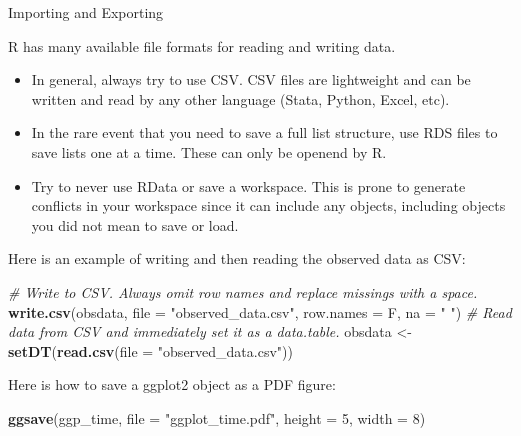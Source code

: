 \documentclass[10pt,ignorenonframetext,]{beamer}
\newenvironment{Shaded}{\begin{snugshade}}{\end{snugshade}}
\newcommand{\KeywordTok}[1]{\textcolor[rgb]{0.13,0.29,0.53}{\textbf{{#1}}}}
\newcommand{\DataTypeTok}[1]{\textcolor[rgb]{0.13,0.29,0.53}{{#1}}}
\newcommand{\DecValTok}[1]{\textcolor[rgb]{0.00,0.00,0.81}{{#1}}}
\newcommand{\StringTok}[1]{\textcolor[rgb]{0.31,0.60,0.02}{{#1}}}
\newcommand{\CommentTok}[1]{\textcolor[rgb]{0.56,0.35,0.01}{\textit{{#1}}}}
\newcommand{\NormalTok}[1]{{#1}}
\providecommand{\tightlist}{%
\setlength{\itemsep}{0pt}\setlength{\parskip}{0pt}}
\begin{document}
\begin{frame}[fragile]{Importing and Exporting}

R has many available file formats for reading and writing data.

\begin{itemize}
\tightlist
\item
  In general, always try to use CSV. CSV files are lightweight and can
  be written and read by any other language (Stata, Python, Excel, etc).
\item
  In the rare event that you need to save a full list structure, use RDS
  files to save lists one at a time. These can only be openend by R.
\item
  Try to never use RData or save a workspace. This is prone to generate
  conflicts in your workspace since it can include any objects,
  including objects you did not mean to save or load.
\end{itemize}

Here is an example of writing and then reading the observed data as CSV:

\footnotesize

\begin{Shaded}
\begin{Highlighting}[]
\CommentTok{# Write to CSV. Always omit row names and replace missings with a space.}
\KeywordTok{write.csv}\NormalTok{(obsdata, }\DataTypeTok{file =} \StringTok{"observed_data.csv"}\NormalTok{, }\DataTypeTok{row.names =} \NormalTok{F, }\DataTypeTok{na =} \StringTok{" "}\NormalTok{)}
\CommentTok{# Read data from CSV and immediately set it as a data.table.}
\NormalTok{obsdata <-}\StringTok{ }\KeywordTok{setDT}\NormalTok{(}\KeywordTok{read.csv}\NormalTok{(}\DataTypeTok{file =} \StringTok{"observed_data.csv"}\NormalTok{))}
\end{Highlighting}
\end{Shaded}

\normalsize

Here is how to save a ggplot2 object as a PDF figure:

\footnotesize

\begin{Shaded}
\begin{Highlighting}[]
\KeywordTok{ggsave}\NormalTok{(ggp_time, }\DataTypeTok{file =} \StringTok{"ggplot_time.pdf"}\NormalTok{, }\DataTypeTok{height =} \DecValTok{5}\NormalTok{, }\DataTypeTok{width =} \DecValTok{8}\NormalTok{)}
\end{Highlighting}
\end{Shaded}

\normalsize

\end{frame}
\end{document}
